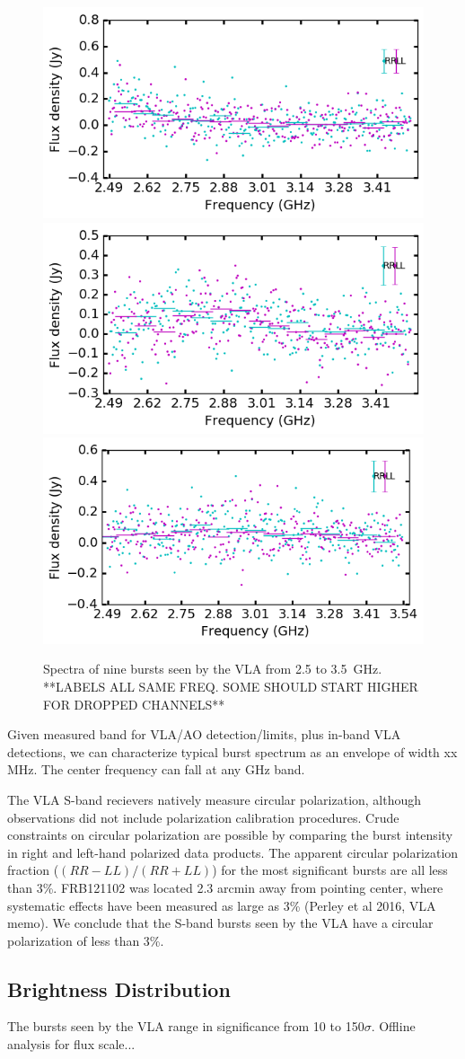\documentclass{emulateapj}
\begin{document}
\begin{figure}[h!]
\begin{center}
 \begin{minipage}{2\columnwidth}
  \includegraphics[width=0.3\columnwidth]{spec_57646.png}
  \includegraphics[width=0.3\columnwidth]{spec_57648.png}
  \includegraphics[width=0.3\columnwidth]{spec_57649.png}
 \end{minipage}
\caption{Spectra of nine bursts seen by the VLA from 2.5 to 3.5~GHz.  **LABELS ALL SAME FREQ. SOME SHOULD START HIGHER FOR DROPPED CHANNELS**
 \label{fig:spec}}
\end{center}
\end{figure}

Given measured band for VLA/AO detection/limits, plus in-band VLA detections, we can characterize typical burst spectrum as an envelope of width xx MHz. The center frequency can fall at any GHz band.

The VLA S-band recievers natively measure circular polarization, although observations did not include polarization calibration procedures. Crude constraints on circular polarization are possible by comparing the burst intensity in right and left-hand polarized data products. The apparent circular polarization fraction ($(RR-LL)/(RR+LL)$) for the most significant bursts are all less than 3\%. FRB121102 was located 2.3 arcmin away from pointing center, where systematic effects have been measured as large as 3\% (Perley et al 2016, VLA memo). We conclude that the S-band bursts seen by the VLA have a circular polarization of less than 3\%.

\subsection{Brightness Distribution}

The bursts seen by the VLA range in significance from 10 to 150$\sigma$. Offline analysis for flux scale...
\end{document}
